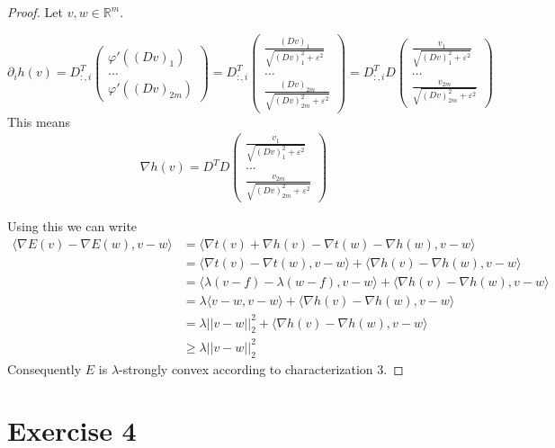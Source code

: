 \documentclass[10pt,a4paper]{article}
\begin{document}
\begin{proof}
  Let $v, w \in \mathbb{R}^{m}$.

  \begin{equation*}
    \partial_{i} h(v) = D_{:,i}^{T} \begin{pmatrix}
      \varphi'((Dv)_{1})\\
      \hdots\\
      \varphi'((Dv)_{2m})
    \end{pmatrix}
    = D_{:,i}^{T} \begin{pmatrix}
      \frac{(Dv)_{1}}{\sqrt{(Dv)_{1}^{2} + \varepsilon^{2}}}\\
      \hdots\\
      \frac{(Dv)_{2m}}{\sqrt{(Dv)_{2m}^{2} + \varepsilon^{2}}}
    \end{pmatrix}
    = D_{:,i}^{T}D \begin{pmatrix}
      \frac{v_{1}}{\sqrt{(Dv)_{1}^{2} + \varepsilon^{2}}}\\
      \hdots\\
      \frac{v_{2m}}{\sqrt{(Dv)_{2m}^{2} + \varepsilon^{2}}}
    \end{pmatrix}
  \end{equation*}
  This means
  \begin{align*}
    \nabla h(v) = D^{T}D \begin{pmatrix}
      \frac{v_{1}}{\sqrt{(Dv)_{1}^{2} + \varepsilon^{2}}}\\
      \hdots\\
      \frac{v_{2m}}{\sqrt{(Dv)_{2m}^{2} + \varepsilon^{2}}}
    \end{pmatrix}
  \end{align*}

  Using this we can write
  \begin{align*}
    \langle \nabla E(v) - \nabla E(w), v - w \rangle & = \langle \nabla t(v) + \nabla h(v) - \nabla t(w) - \nabla h(w), v - w \rangle\\
                                                     & = \langle \nabla t(v) - \nabla t(w), v - w \rangle + \langle \nabla h(v) - \nabla h(w), v - w \rangle\\
                                                     & = \langle \lambda(v - f) - \lambda(w - f), v - w \rangle + \langle \nabla h(v) - \nabla h(w), v - w \rangle\\
                                                     & = \lambda\langle v - w, v - w \rangle + \langle \nabla h(v) - \nabla h(w), v - w \rangle\\
                                                     & = \lambda ||v - w||_{2}^{2} + \langle \nabla h(v) - \nabla h(w), v - w \rangle\\
                                                     & \ge \lambda ||v - w||_{2}^{2}
  \end{align*}
  Consequently $E$ is $\lambda$-strongly convex according to characterization 3.
\end{proof}

\section*{Exercise 4}
\end{document}
